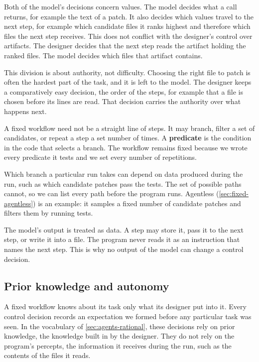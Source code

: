 Both of the model's decisions concern values. The model decides what a call returns, for example
the text of a patch. It also decides which values travel to the next step, for example which
candidate files it ranks highest and therefore which files the next step receives. This does not
conflict with the designer's control over artifacts. The designer decides that the next step reads
the artifact holding the ranked files. The model decides which files that artifact contains.

This division is about authority, not difficulty. Choosing the right file to patch is often the
hardest part of the task, and it is left to the model. The designer keeps a comparatively easy
decision, the order of the steps, for example that a file is chosen before its lines are read.
That decision carries the authority over what happens next.

A fixed workflow need not be a straight line of steps. It may branch, filter a set of candidates,
or repeat a step a set number of times. A \textbf{predicate} is the condition in the code that
selects a branch. The workflow remains fixed because we wrote every predicate it tests and we set
every number of repetitions.

Which branch a particular run takes can depend on data produced during the run, such as which
candidate patches pass the tests. The set of possible paths cannot, so we can list every path
before the program runs. Agentless (\cref{sec:fixed-agentless}) is an example: it samples a fixed
number of candidate patches and filters them by running tests.

The model's output is treated as data. A step may store it, pass it to the next step, or write it
into a file. The program never reads it as an instruction that names the next step. This is why no
output of the model can change a control decision.

\subsection{Prior knowledge and autonomy}
\label{sec:fixed-autonomy}

A fixed workflow knows about its task only what its designer put into it. Every control decision
records an expectation we formed before any particular task was seen. In the vocabulary of
\cref{sec:agents-rational}, these decisions rely on prior knowledge, the knowledge built in by the designer.
They do not rely on the program's percepts, the information it receives during the run, such as the
contents of the files it reads.

